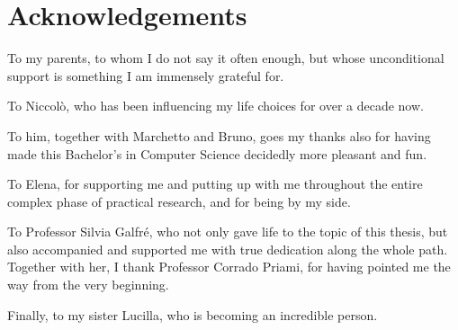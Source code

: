 \chapter*{Acknowledgements}

To my parents, to whom I do not say it often enough, but whose unconditional
support is something I am immensely grateful for.

\bigskip

To Niccolò, who has been influencing my life choices for over a decade now.

\bigskip

To him, together with Marchetto and Bruno, goes my thanks also for having
made this Bachelor's in Computer Science decidedly more pleasant and fun.

\bigskip

To Elena, for supporting me and putting up with me
throughout the entire complex phase of practical research, and for being by my side.

\bigskip

To Professor Silvia Galfré, who not only gave life to the topic of this
thesis, but also accompanied and supported me with true dedication along the
whole path. Together with her, I thank Professor Corrado Priami, for having
pointed me the way from the very beginning.

\bigskip

Finally, to my sister Lucilla, who is becoming an incredible person.
